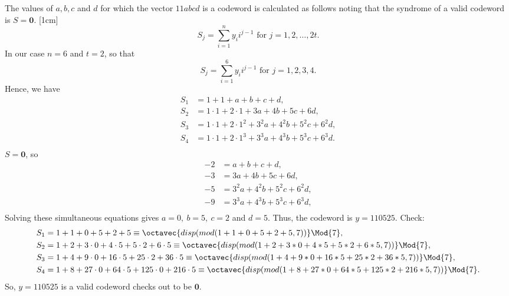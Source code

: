 The values of $a, b, c$ and $d$ for which the vector $11abcd$ is a codeword is calculated as follows noting that the syndrome of a valid codeword is $S = \bm{0}$.
[1cm]
\[
	S_j = \sum_{i=1}^n y_i i^{j-1}\textrm{ for } j=1, 2, \ldots, 2t.
\]
In our case $n=6$ and $t=2$, so that 
\[
	S_j = \sum_{i=1}^6 y_i i^{j-1}\textrm{ for } j=1, 2, 3, 4.
\]
Hence, we have
\begin{align*}
	S_1 &= 1 + 1 + a + b + c + d,\\
	S_2 &= 1\cdot1 + 2\cdot1 + 3a + 4b + 5c + 6d,\\
	S_3 &= 1\cdot1 + 2\cdot1^2 + 3^2a + 4^2b + 5^2c + 6^2d,\\
	S_4 &= 1\cdot1 + 2\cdot1^3 + 3^3a + 4^3b + 5^3c + 6^3d.\\
\end{align*}
$S=\bm{0}$, so
\begin{align*}
	-2 &= a + b + c + d,\\
	-3 &= 3a + 4b + 5c + 6d,\\
	-5 &= 3^2a + 4^2b + 5^2c + 6^2d,\\
	-9 &= 3^3a + 4^3b + 5^3c + 6^3d,\\
\end{align*}
Solving these simultaneous equations gives $a=0,\ b=5,\ c=2$ and $d=5$. Thus, the codeword is $y=110525$.  Check:
\begin{align*}
	S_1 &= 1 + 1 + 0 + 5 + 2 + 5 \equiv \octavec{disp(mod(1 + 1 + 0 + 5 + 2 + 5,7))} \Mod{7},\\
	S_2 &= 1 + 2 + 3\cdot0 + 4\cdot5 + 5\cdot2 + 6\cdot5 \equiv \octavec{disp(mod( 1 + 2 + 3*0 + 4*5 + 5*2 + 6*5,7))} \Mod{7},\\
	S_3 &= 1 + 4  + 9\cdot0 + 16\cdot5 + 25\cdot2 + 36\cdot5 \equiv \octavec{disp(mod(1 + 4  + 9*0 + 16*5 + 25*2 + 36*5,7))} \Mod{7},\\
	S_4 &= 1 + 8 + 27\cdot0 + 64\cdot5 + 125\cdot0 + 216\cdot5 \equiv \octavec{disp(mod(1 + 8 + 27*0 + 64*5 + 125*2 + 216*5,7))} \Mod{7}.
\end{align*}
So,  $y=110525$ is a valid codeword checks out to be $\bm{0}$.